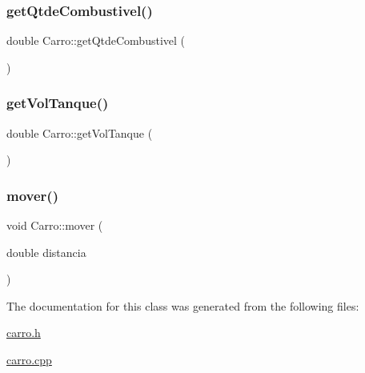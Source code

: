 \mbox{\label{classCarro_a1150918964334e854ac75bab0f6ca3c9}} 
\subsubsection{\texorpdfstring{get\+Qtde\+Combustivel()}{getQtdeCombustivel()}}
{\footnotesize\ttfamily double Carro\+::get\+Qtde\+Combustivel (\begin{DoxyParamCaption}{ }\end{DoxyParamCaption})}

\mbox{\label{classCarro_ad859d4f2e5e81627260d39a5c840d6bb}} 
\subsubsection{\texorpdfstring{get\+Vol\+Tanque()}{getVolTanque()}}
{\footnotesize\ttfamily double Carro\+::get\+Vol\+Tanque (\begin{DoxyParamCaption}{ }\end{DoxyParamCaption})}

\mbox{\label{classCarro_aae2b769087b2604569d393886e61dfa2}} 
\subsubsection{\texorpdfstring{mover()}{mover()}}
{\footnotesize\ttfamily void Carro\+::mover (\begin{DoxyParamCaption}\item[{double}]{distancia }\end{DoxyParamCaption})}



The documentation for this class was generated from the following files\+:\begin{DoxyCompactItemize}
\item 
\hyperlink{carro_8h}{carro.\+h}\item 
\hyperlink{carro_8cpp}{carro.\+cpp}\end{DoxyCompactItemize}
